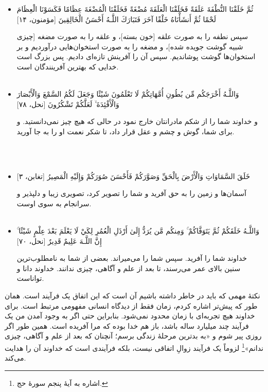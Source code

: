 \begin{itemize}
	\item[]
	{
		ثُمَّ خَلَقْنَا النُّطْفَةَ عَلَقَةً فَخَلَقْنَا الْعَلَقَةَ مُضْغَةً فَخَلَقْنَا الْمُضْغَةَ عِظَامًا فَكَسَوْنَا الْعِظَامَ لَحْمًا ثُمَّ أَنشَأْنَاهُ خَلْقًا آخَرَ  فَتَبَارَكَ اللَّـهُ أَحْسَنُ الْخَالِقِينَ [مؤمنون، ۱۴]}
	
	{
		سپس نطفه را به صورت علقه [خون بسته‌]، و علقه را به صورت مضغه [چیزی شبیه گوشت جویده شده‌]، و مضغه را به صورت استخوان‌هایی درآوردیم و بر استخوان‌ها گوشت پوشاندیم. سپس آن را آفرینش تازه‌ای دادیم. پس بزرگ است خدایی که بهترین آفرینندگان است.
	}
	~\\~
	\item[]
	{
		وَاللَّـهُ أَخْرَجَكُم مِّن بُطُونِ أُمَّهَاتِكُمْ لَا تَعْلَمُونَ شَيْئًا وَجَعَلَ لَكُمُ السَّمْعَ وَالْأَبْصَارَ وَالْأَفْئِدَةَ ۙ لَعَلَّكُمْ تَشْكُرُونَ [نحل، ۷۸]}
	
	
	{
		و خداوند شما را از شکم مادرانتان خارج نمود در حالی که هیچ چیز نمی‌دانستید. و برای شما، گوش و چشم و عقل قرار داد، تا شکر نعمت او را به جا آورید.  
	}
	
	~\\~
	\item[]
	{
		خَلَقَ السَّمَاوَاتِ وَالْأَرْضَ بِالْحَقِّ وَصَوَّرَكُمْ فَأَحْسَنَ صُوَرَكُمْ وَإِلَيْهِ الْمَصِيرُ [تغابن، ۳]}
	
	{
		آسمان‌ها و زمین را به حق آفرید و شما را  تصویر کرد، تصویری زیبا و دلپذیر و سرانجام به سوی اوست. 
	}
	~\\~
	\item[]
	{
		وَاللَّـهُ خَلَقَكُمْ ثُمَّ يَتَوَفَّاكُمْ ۚ وَمِنكُم مَّن يُرَدُّ إِلَىٰ أَرْذَلِ الْعُمُرِ لِكَيْ لَا يَعْلَمَ بَعْدَ عِلْمٍ شَيْئًا ۚ إِنَّ اللَّـهَ عَلِيمٌ قَدِيرٌ [نحل، ۷۰]}
	
	{
		خداوند شما را آفرید. سپس شما را می‌میراند. بعضی از شما به نامطلوب‌ترین سنین بالای عمر می‌رسند، تا بعد از علم و آگاهی، چیزی ندانند. خداوند دانا و تواناست. 
	}
\end{itemize}

نکتهٔ مهمی که باید در خاطر داشته باشیم آن است که این  اتفاق یک فرآیند است. همان طور که پیش‌تر اشاره کردم، زمان فقط از دیدگاه انسانی مفهومی مرتبط است. برای خداوند هیچ تجربه‌ای با زمان محدود نمی‌شود. بنابراین حتی اگر به وجود آمدن من یک فرآیند چند میلیارد ساله باشد، باز هم خدا بوده که مرا آفریده است. همین طور اگر روزی پیر شوم و «به بدترین مرحلهٔ زندگی برسم؛ آنچنان که بعد از علم و آگاهی، چیزی ندانم»\footnote
{اشاره به آیهٔ پنجم سورهٔ حج.}  
لزوماً یک فرآیند زوالِ اتفاقی نیست، بلکه فرآیندی است که خداوند آن را هدایت می‌کند.

